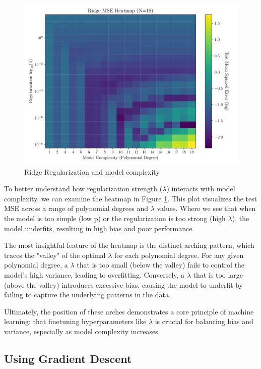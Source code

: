 \documentclass[twocolumn,aps]{revtex4}
\begin{document}
\begin{figure}[h]
    \centering
    \includegraphics[width=.95 \linewidth]{Figures/Ridge_Degree_Lambda_Heatmap.pdf}
    \caption{Ridge Regularization and model complexity}
    \label{fig:RidgeHeat}
\end{figure}


To better understand how regularization strength ($\lambda$) interacts with model complexity, we can examine the heatmap in Figure \ref{fig:RidgeHeat}. 
This plot visualizes the test MSE across a range of polynomial degrees and $\lambda$ values. 
Where we see that when the model is too simple (low p) or the regularization is too strong (high $\lambda$), the model underfits, resulting in high bias and poor performance.

The most insightful feature of the heatmap is the distinct arching pattern, which traces the "valley" of the optimal $\lambda$ for each polynomial degree.
For any given polynomial degree, a $\lambda$ that is too small (below the valley) fails to control the model's high variance, leading to overfitting.
Conversely, a $\lambda$ that is too large (above the valley) introduces excessive bias, causing the model to underfit by failing to capture the underlying patterns in the data.

Ultimately, the position of these arches demonstrates a core principle of machine learning: that finetuning hyperparameters like $\lambda$ is crucial for balancing bias and variance, especially as model complexity increases.


\subsection{Using Gradient Descent}
\end{document}
